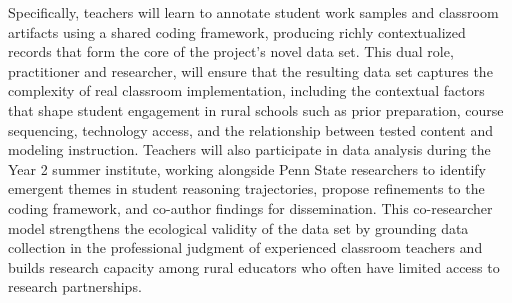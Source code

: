 \documentclass[11pt]{article}
\begin{document}
Specifically, teachers will learn to annotate student work samples and classroom artifacts using a shared coding framework, producing richly contextualized records that form the core of the project's novel data set.
This dual role, practitioner and researcher, will ensure that the resulting data set captures the complexity of real classroom implementation, including the contextual factors that shape student engagement in rural schools such as prior preparation, course sequencing, technology access, and the relationship between tested content and modeling instruction. 
Teachers will also participate in data analysis during the Year 2 summer institute, working alongside Penn State researchers to identify emergent themes in student reasoning trajectories, propose refinements to the coding framework, and co-author findings for dissemination.
This co-researcher model strengthens the ecological validity of the data set by grounding data collection in the professional judgment of experienced classroom teachers \cite{Henrick2017} and builds research capacity among rural educators who often have limited access to research partnerships.
\end{document}
